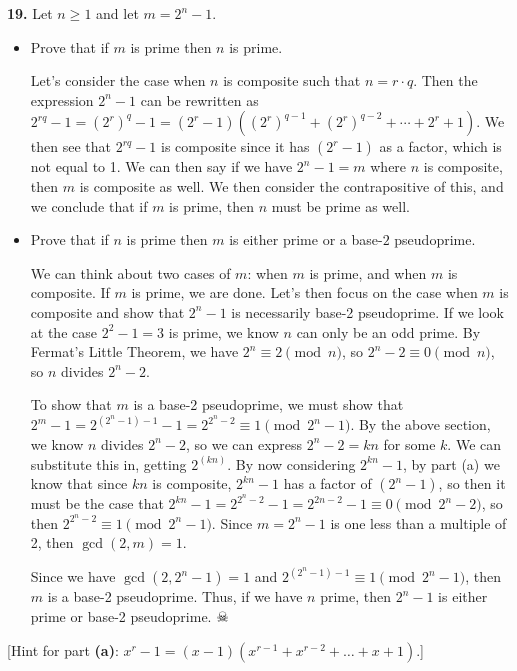 \documentclass[12pt]{amsart}
\begin{document}
{\bf 19.}  Let $n\geq1$ and let $m=2^n-1$. 
\begin{itemize}
	\item[{\bf (a)}]  Prove that if $m$ is prime then $n$ is prime.  
	
	\medskip
	
	Let's consider the case when $n$ is composite such that $n=r\cdot q$. Then the expression $2^n - 1$ can be rewritten as $2^{rq} - 1 = (2^r)^q - 1 = (2^r - 1)\left((2^r)^{q-1} + (2^r)^{q-2} +\cdots + 2^r + 1\right)$. We then see that $2^{rq} - 1$ is composite since it has $(2^r - 1)$ as a factor, which is not equal to 1. We can then say if we have $2^n - 1 = m$ where $n$ is composite, then $m$ is composite as well. We then consider the contrapositive of this, and we conclude that if $m$ is prime, then $n$ must be prime as well. 
	
	\medskip
	
	
	\item[{\bf (b)}]  Prove that if $n$ is prime then $m$ is either prime or a base-$2$ pseudoprime.
	
	\medskip
	
	We can think about two cases of $m$: when $m$ is prime, and when $m$ is composite. If $m$ is prime, we are done. Let's then focus on the case when $m$ is composite and show that $2^n - 1$ is necessarily base-2 pseudoprime. If we look at the case $2^2 - 1 = 3$ is prime, we know $n$ can only be an odd prime. By Fermat's Little Theorem, we have $2^n \equiv 2\pmod{n}$, so $2^n - 2 \equiv 0\pmod{n}$, so $n$ divides $2^n - 2$. 
	
	\smallskip
	
	To show that $m$ is a base-2 pseudoprime, we must show that $2^m - 1 = 2^{(2^n - 1)-1}-1 = 2^{2^n - 2}\equiv 1\pmod{2^n - 1}$. By the above section, we know $n$ divides $2^n - 2$, so we can express $2^n - 2 = kn$ for some $k$. We can substitute this in, getting $2^(kn)$. By now considering $2^{kn} - 1$, by part (a) we know that since $kn$ is composite, $2^{kn} - 1$ has a factor of $(2^n - 1)$, so then it must be the case that $2^{kn}-1=2^{2^n - 2}-1 = 2^{2n - 2}-1\equiv 0\pmod{2^n - 2}$, so then $2^{2^n - 2}\equiv 1\pmod{2^n - 1}$. Since $m=2^n - 1$ is one less than a multiple of 2, then $\gcd(2, m) = 1$. 
	
	\smallskip
	
	Since we have $\gcd(2, 2^n - 1) = 1$ and $2^{(2^n - 1) - 1} \equiv 1\pmod{2^n - 1}$, then $m$ is a base-2 pseudoprime. Thus, if we have $n$ prime, then $2^n - 1$ is either prime or base-2 pseudoprime. $\skull$
	\medskip
\end{itemize}
[Hint for part {\bf (a)}: $x^r-1=(x-1)(x^{r-1}+x^{r-2}+\dots+x+1)$.]
\end{document}
